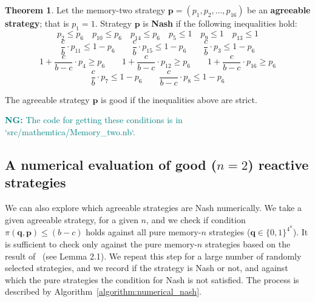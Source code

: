 \documentclass{article}
\theoremstyle{definition}
\newtheorem{theorem}{Theorem}[section]
\newcommand{\nikoleta}[1]{\textcolor{teal}{{\bf NG:} #1}}
\begin{document}
\begin{theorem}\label{theorem:memory_two_nash_and_good}
  Let the memory-two strategy \(\mathbf{p} = (p_{1}, p_{2}, \dots, p_{16})\) be an \textbf{agreeable
  strategy}; that is \(p_1 = 1\). Strategy \(\mathbf{p}\) is \textbf{Nash} if the
  following inequalities hold:
  \begin{equation*}
      p_2 \leq  p_{6} \quad p_{10} \leq  p_{6} \quad p_{14} \leq  p_{6}  \quad  p_5 \leq 1 \quad p_9 \leq 1 \quad p_{13}  \leq 1
  \end{equation*}
  \begin{equation*}
  \frac{c}{b} \cdot p_{11} \leq 1 - p_{6} \qquad \frac{c}{b} \cdot p_{15} \leq 1 - p_{6}  \qquad \frac{c}{b} \cdot p_{3} \leq 1 - p_{6}
\end{equation*}
  \begin{equation*}
    1 + \frac{c}{b - c} \cdot p_{4}  \geq p_6 \qquad  1 + \frac{c}{b - c} \cdot p_{12}  \geq p_6  \qquad 1 + \frac{c}{b - c} \cdot p_{16} \geq p_6
  \end{equation*}
  \begin{equation*}
        \frac{c}{b} \cdot p_{7} \leq 1 - p_6  \qquad \frac{c}{b -c} \cdot p_{8} \leq 1 - p_6
  \end{equation*}

  The agreeable strategy \(\mathbf{p}\) is good if the inequalities above are strict.
\end{theorem}

\nikoleta{The code for getting these conditions is in `src/mathemtica/Memory\_two.nb`.}

\subsection{A numerical evaluation of good (\(n=2\)) reactive strategies}\label{section:good_strategies_numerically}

We can also explore which agreeable strategies are Nash numerically. We take a
given agreeable strategy, for a given \(n\), and we check if condition
\(\pi({\mathbf{q}}, \mathbf{p}) \leq (b - c)\) holds against all pure
memory-\(n\) strategies (\(\mathbf{q} \in \{0, 1\}^{4 ^ n}\)). It is
sufficient to check only against the pure memory-\(n\) strategies based on the
result of~\citep{mcavoy:PRSA:2019} (see Lemma 2.1). We repeat this step for a
large number of randomly selected strategies, and we record if the strategy is
Nash or not, and against which the pure strategies the condition for Nash is not
satisfied. The process is described by Algorithm~\ref{algorithm:numerical_nash}.
\end{document}
